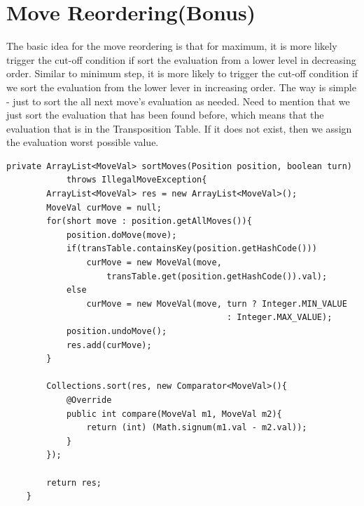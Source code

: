 \documentclass{article}
\begin{document}
\section{Move Reordering(Bonus)}
The basic idea for the move reordering is that for maximum, it is more likely trigger the cut-off condition if sort the evaluation from a lower level in decreasing order. Similar to minimum step, it is more likely to trigger the cut-off condition if we sort the evaluation from the lower lever in increasing order. The way is simple - just to sort the all next move's evaluation as needed. Need to mention that we just sort the evaluation that has been found before, which means that the evaluation that is in the Transposition Table. If it does not exist, then we assign the evaluation worst possible value.
\begin{lstlisting}
private ArrayList<MoveVal> sortMoves(Position position, boolean turn) 
			throws IllegalMoveException{
		ArrayList<MoveVal> res = new ArrayList<MoveVal>();
		MoveVal curMove = null;
		for(short move : position.getAllMoves()){
			position.doMove(move);
			if(transTable.containsKey(position.getHashCode()))
				curMove = new MoveVal(move, 
					transTable.get(position.getHashCode()).val);
			else
				curMove = new MoveVal(move, turn ? Integer.MIN_VALUE 
											: Integer.MAX_VALUE);
			position.undoMove();
			res.add(curMove);
		}
		
		Collections.sort(res, new Comparator<MoveVal>(){
			@Override
			public int compare(MoveVal m1, MoveVal m2){
				return (int) (Math.signum(m1.val - m2.val));
			}
		});
		
		return res;
	}
\end{lstlisting}
\end{document}
